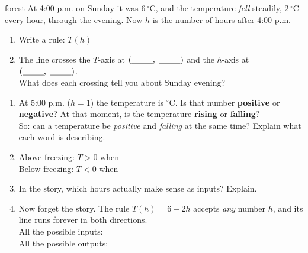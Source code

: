\documentclass[12pt]{article}
\newcommand{\answerspace}[2]{\par\nopagebreak\noindent\begin{minipage}[t][#1][t]{\linewidth}%
  \color{keyred}\bfseries #2\end{minipage}\par}
\newcommand{\tempgrid}{%
  \draw[step=1, linegray!40, very thin] (0,-8) grid (7,8);
  \draw[->, semithick, charcoal] (0,0)--(7.6,0) node[right, font=\scriptsize]{$h$};
  \draw[->, semithick, charcoal] (0,-8.6)--(0,8.8) node[above, font=\scriptsize]{$T$ ($^\circ$C)};
  \foreach \x in {1,...,7} \node[charcoal, font=\tiny, below] at (\x,0){\x};
  \foreach \y in {-8,-6,-4,-2,2,4,6,8} \node[charcoal, font=\tiny, left] at (0,\y){\y};}
\begin{document}
\boxguard[16]
\begin{scenariobox}{forest}
At 4:00 p.m. on Sunday it was $6\,^\circ$C, and the temperature \emph{fell} steadily, $2\,^\circ$C
every hour, through the evening. Now $h$ is the number of hours after 4:00 p.m.

\begin{minipage}[t]{0.52\linewidth}
\vspace{0pt}
\begin{enumerate}[label=\textbf{\alph*.}, leftmargin=1.8em, itemsep=8pt]
  \item Write a rule: \; $T(h) = $ \blank{3.0cm}
  \item The line crosses the $T$-axis at $(\blank{0.9cm},\ \blank{0.9cm})$ and the $h$-axis at
        $(\blank{0.9cm},\ \blank{0.9cm})$. \\[4pt]
        What does each crossing tell you about Sunday evening?
\end{enumerate}
\end{minipage}\hfill
\begin{minipage}[t]{0.44\linewidth}
\vspace{0pt}\centering
{}
\end{minipage}
\answerspace{2.4cm}{}

\begin{enumerate}[label=\textbf{\alph*.}, start=3, leftmargin=1.8em, itemsep=8pt]
  \item At 5:00 p.m. ($h=1$) the temperature is \blank{1.2cm} $^\circ$C. Is that number
        \textbf{positive} or \textbf{negative}? At that moment, is the temperature \textbf{rising}
        or \textbf{falling}? \\[4pt]
        So: can a temperature be \emph{positive} and \emph{falling} at the same time? Explain
        what each word is describing.
        \answerspace{2.6cm}{}
  \item Above freezing: $T>0$ when \blank{3.6cm} \\[6pt]
        Below freezing: $T<0$ when \blank{3.6cm}
  \item In the story, which hours actually make sense as inputs? Explain.
        \answerspace{1.8cm}{}
  \item Now forget the story. The rule $T(h) = 6 - 2h$ accepts \emph{any} number $h$, and its
        line runs forever in both directions. \\[6pt]
        All the possible inputs: \blank{3.4cm} \\[6pt]
        All the possible outputs: \blank{3.4cm}
\end{enumerate}
\end{scenariobox}
\end{document}
